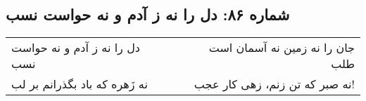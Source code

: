\begin{center}
\section*{شماره ۸۶: دل را نه ز آدم و نه حواست نسب}
\label{sec:086}
\begin{longtable}{l p{0.5cm} r}
دل را نه ز آدم و نه حواست نسب
&&
جان را نه زمین نه آسمان است طلب
\\
نه زَهره که باد بگذرانم بر لب
&&
نه صبر که تن زنم، زهی کار عجب!
\\
\end{longtable}
\end{center}
